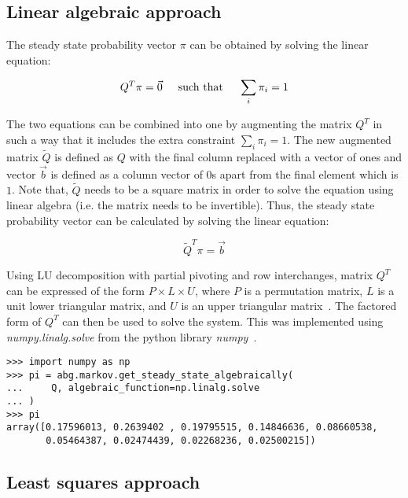 \subsection{Linear algebraic approach}

The steady state probability vector \( \pi \) can be obtained by solving the
linear equation:

\begin{equation}\label{eq:numpy_linalg_solve_1}
    Q^T \pi = \vec{0} \hspace{0.5cm} \text{such that} \hspace{0.5cm}
    \sum_{i} \pi_i = 1
\end{equation}

The two equations can be combined into one by augmenting the matrix \( Q^T \)
in such a way that it includes the extra constraint \( \sum_i \pi_i = 1 \).
The new augmented matrix \(\tilde Q\) is defined as \(Q\) with the final
column replaced with a vector of ones and vector \(\vec{b}\) is defined
as a column vector of \(0\)s apart from the final element which is \(1\).
Note that, \(\tilde Q\) needs to be a square matrix in order to solve the
equation using linear algebra (i.e. the matrix needs to be invertible).
Thus, the steady state probability vector can be calculated by solving the
linear equation:

\begin{equation}
    \tilde Q^T \pi = \vec{b}
\end{equation}

Using LU decomposition with partial pivoting and row interchanges, matrix
\(Q^T\) can be expressed of the form \(P \times L \times U\), where \(P\) is
a permutation matrix, \(L\) is a unit lower triangular matrix, and \(U\) is
an upper triangular matrix~\cite{strang2006linear}.
The factored form of \(Q^T\) can then be used to solve the system.
This was implemented using \textit{numpy.linalg.solve} from the
python library \textit{numpy}~\cite{2020NumPy-Array, lapack99}.


\begin{lstlisting}[style=pystyle]
>>> import numpy as np
>>> pi = abg.markov.get_steady_state_algebraically(
...     Q, algebraic_function=np.linalg.solve
... )
>>> pi
array([0.17596013, 0.2639402 , 0.19795515, 0.14846636, 0.08660538,
       0.05464387, 0.02474439, 0.02268236, 0.02500215])

\end{lstlisting}


\subsection{Least squares approach}

